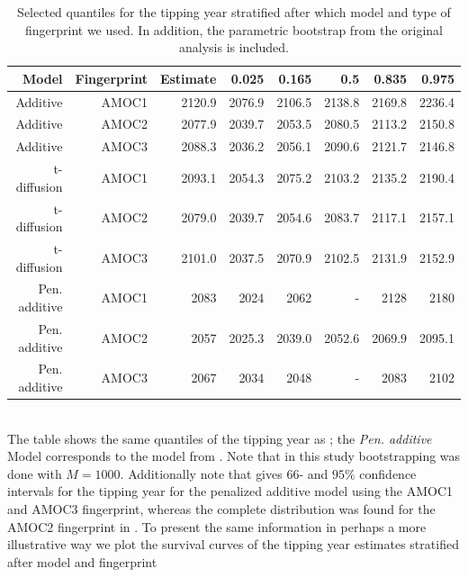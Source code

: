 \begin{table}[ht]
    \centering
    \begin{tabular}{rrrrrrrr}
    Model & Fingerprint & Estimate    & 0.025  & 0.165  & 0.5    & 0.835  & 0.975 \\ 
      \hline
    Additive & AMOC1 & 2120.9         & 2076.9 & 2106.5 & 2138.8 & 2169.8 & 2236.4 \\
    Additive & AMOC2 & 2077.9         & 2039.7 & 2053.5 & 2080.5 & 2113.2 & 2150.8 \\ 
    Additive & AMOC3 & 2088.3         & 2036.2 & 2056.1 & 2090.6 & 2121.7 & 2146.8 \\ \hline 
    t-diffusion & AMOC1 & 2093.1      & 2054.3 & 2075.2 & 2103.2 & 2135.2 & 2190.4 \\ 
    t-diffusion & AMOC2 & 2079.0      & 2039.7 & 2054.6 & 2083.7 & 2117.1 & 2157.1 \\ 
    t-diffusion & AMOC3 & 2101.0      & 2037.5 & 2070.9 & 2102.5 & 2131.9 & 2152.9 \\ 
    \hline 
    Pen. additive& AMOC1 & 2083       & 2024 & 2062 & - & 2128 & 2180 \\
    Pen. additive& AMOC2 & 2057       & 2025.3 & 2039.0 & 2052.6 & 2069.9 & 2095.1 \\ 
    Pen. additive& AMOC3 & 2067       & 2034 & 2048 & - & 2083 & 2102 \\
       \hline
    \end{tabular}
    \caption{Selected quantiles for the tipping year stratified after which model and type of fingerprint we used. In addition, the parametric bootstrap from the original analysis \cite{Ditlevsen2023} is included.}
    \label{table:tipping_quantiles}
\end{table}\\
The table shows the same quantiles of the tipping year as \cite{DitlevsenSupplementary}; the \textit{Pen. additive} Model corresponds to the model from \cite{Ditlevsen2023}. Note that in this study bootstrapping was done with $M = 1000$. Additionally note that \cite[Table 1]{Ditlevsen2023} gives $66$- and $95\%$ confidence intervals for the tipping year for the penalized additive model using the AMOC1 and AMOC3 fingerprint, whereas the complete distribution was found for the AMOC2 fingerprint in \cite{DitlevsenSupplementary}.\newpage 
\noindent To present the same information in perhaps a more illustrative way we plot the survival curves of the tipping year estimates stratified after model and fingerprint
